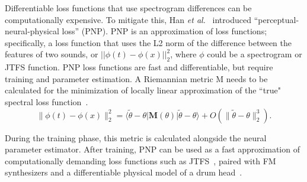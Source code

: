 \documentclass[lettersize,journal]{IEEEtran}
\begin{document}


Differentiable loss functions that use spectrogram differences can be computationally expensive. To mitigate this, Han \textit{et al.}~\cite{han2023perceptual} introduced ``perceptual-neural-physical loss'' (PNP). PNP is an approximation of loss functions; specifically, a loss function that uses the L2 norm of the difference between the features of two sounds, or $||\phi(t) - \phi(x)||^2_2$, where $\phi$ could be a spectrogram or JTFS function. PNP loss functions are fast and differentiable, but require training and parameter estimation. A Riemannian metric M needs to be calculated for the minimization of locally linear approximation of the ``true" spectral loss function~\cite{han2023perceptual}. 
\[
\|\phi(t) - \phi(x)\|_2^2 = \langle \tilde{\theta} - \theta | \mathbf{M}(\theta) | \tilde{\theta} - \theta \rangle + O(\|\tilde{\theta} - \theta\|_2^3). \tag{4}
\]

During the training phase, this metric is calculated alongside the neural parameter estimator. After training, PNP can be used as a fast approximation of computationally demanding loss functions such as JTFS~\cite{han2023perceptual,han2024learning}, paired with FM synthesizers and a differentiable physical model of a drum head~\cite{smith2010physical}.
\end{document}
